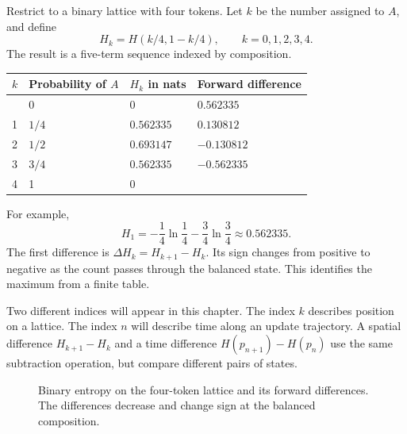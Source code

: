 \documentclass[11pt,oneside,openany]{book}
\theoremstyle{definition}
\theoremstyle{remark}
\numberwithin{equation}{chapter}
\begin{document}
Restrict to a binary lattice with four tokens. Let \(k\) be the number assigned to \(A\), and define \[H_k=H(k/4,1-k/4),\qquad k=0,1,2,3,4.\] The result is a five-term sequence indexed by composition.

\begin{longtable}[]{@{}llll@{}}
\toprule\noalign{}
\(k\) & Probability of \(A\) & \(H_k\) in nats & Forward difference \\
\midrule\noalign{}
\endhead
\bottomrule\noalign{}
\endlastfoot
0 & 0 & 0 & \(0.562335\) \\
1 & \(1/4\) & \(0.562335\) & \(0.130812\) \\
2 & \(1/2\) & \(0.693147\) & \(-0.130812\) \\
3 & \(3/4\) & \(0.562335\) & \(-0.562335\) \\
4 & 1 & 0 & \\
\end{longtable}

For example, \[H_1=-\frac14\ln\frac14-\frac34\ln\frac34\approx0.562335.\] The first difference is \(\Delta H_k=H_{k+1}-H_k\). Its sign changes from positive to negative as the count passes through the balanced state. This identifies the maximum from a finite table.

Two different indices will appear in this chapter. The index \(k\) describes position on a lattice. The index \(n\) will describe time along an update trajectory. A spatial difference \(H_{k+1}-H_k\) and a time difference \(H(p_{n+1})-H(p_n)\) use the same subtraction operation, but compare different pairs of states.

\begin{figure}[htbp]\centering
{}
\caption{Binary entropy on the four-token lattice and its forward differences. The differences decrease and change sign at the balanced composition.}\end{figure}
\end{document}
